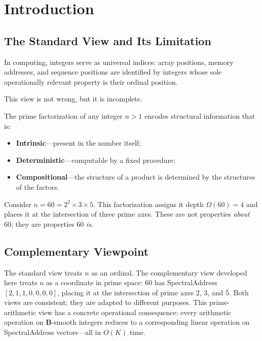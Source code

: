 \documentclass[10pt,twocolumn]{article}
\newcommand{\Om}{\Omega}
\newcommand{\B}{\mathbf{B}}
\begin{document}
\section{Introduction}

\subsection{The Standard View and Its Limitation}

In computing, integers serve as universal indices: array positions, memory
addresses, and sequence positions are identified by integers whose sole
operationally relevant property is their ordinal position.

This view is not wrong, but it is incomplete.

The prime factorization of any integer $n > 1$ encodes structural
information that is:
\begin{itemize}[noitemsep, topsep=2pt]
  \item \textbf{Intrinsic}---present in the number itself;
  \item \textbf{Deterministic}---computable by a fixed procedure;
  \item \textbf{Compositional}---the structure of a product is determined
        by the structures of the factors.
\end{itemize}

Consider $n = 60 = 2^2 \times 3 \times 5$.  This factorization assigns it
depth $\Om(60) = 4$ and places it at the intersection of three prime axes.
These are not properties \emph{about} 60; they are properties 60
\emph{is}.

\subsection{Complementary Viewpoint}

The standard view treats $n$ as an ordinal. The complementary view
developed here treats $n$ as a coordinate in prime space: $60$ has
SpectralAddress $[2,1,1,0,0,0,0]$, placing it at the intersection of
prime axes 2, 3, and 5. Both views are consistent; they are adapted to
different purposes. This prime-arithmetic view has a concrete operational
consequence: every arithmetic operation on $\B$-smooth integers reduces to
a corresponding linear operation on SpectralAddress vectors---all in $O(K)$
time.
\end{document}
